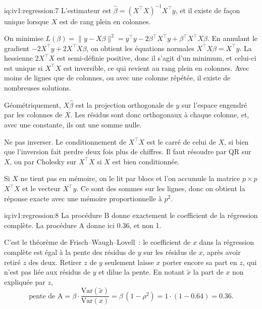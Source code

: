 \begin{solution}{iq:iv1:regression:7}
L'estimateur est $\hat\beta = (X^\top X)^{-1}X^\top y$, et il existe de façon unique lorsque $X$ est de rang plein en colonnes.

On minimise $L(\beta) = \lVert y - X\beta\rVert^2 = y^\top y - 2\beta^\top X^\top y + \beta^\top X^\top X\beta$. En annulant le gradient $-2X^\top y + 2X^\top X\beta$, on obtient les équations normales $X^\top X\beta = X^\top y$. La hessienne $2X^\top X$ est semi-définie positive, donc il s'agit d'un minimum, et celui-ci est unique si $X^\top X$ est inversible, ce qui revient au rang plein en colonnes. Avec moins de lignes que de colonnes, ou avec une colonne répétée, il existe de nombreuses solutions.

Géométriquement, $X\hat\beta$ est la projection orthogonale de $y$ sur l'espace engendré par les colonnes de $X$. Les résidus sont donc orthogonaux à chaque colonne, et, avec une constante, ils ont une somme nulle.

Ne pas inverser. Le conditionnement de $X^\top X$ est le carré de celui de $X$, si bien que l'inversion fait perdre deux fois plus de chiffres. Il faut résoudre par QR sur $X$, ou par Cholesky sur $X^\top X$ si $X$ est bien conditionnée.

Si $X$ ne tient pas en mémoire, on le lit par blocs et l'on accumule la matrice $p \times p$ $X^\top X$ et le vecteur $X^\top y$. Ce sont des sommes sur les lignes, donc on obtient la réponse exacte avec une mémoire proportionnelle à $p^2$.

\end{solution}

\begin{solution}{iq:iv1:regression:8}
La procédure B donne exactement le coefficient de la régression complète. La procédure A donne ici $0.36$, et non 1.

C'est le théorème de Frisch--Waugh--Lovell~: le coefficient de $x$ dans la régression complète est égal à la pente des résidus de $y$ sur les résidus de $x$, après avoir retiré $z$ des deux. Retirer $z$ de $y$ seulement laisse $x$ porter encore sa part en $z$, qui n'est pas liée aux résidus de $y$ et dilue la pente. En notant $\tilde x$ la part de $x$ non expliquée par $z$,
\[
\text{pente de A} = \beta \cdot \frac{\mathrm{Var}(\tilde x)}{\mathrm{Var}(x)} = \beta\,(1 - \rho^2) = 1 \cdot (1 - 0.64) = 0.36 .
\]
\end{solution}

